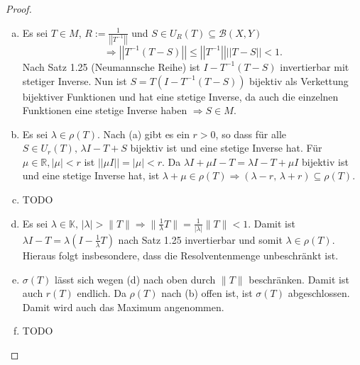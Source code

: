 \documentclass[ngerman]{article}
\theoremstyle{definition}%
\newcommand{\R}{\mathbb{R}}
\newcommand{\K}{\mathbb{K}}
\newcommand{\B}{\mathcal{B}} %
\newcommand{\abs}[1]{\left\lvert #1 \right\rvert }
\newcommand{\norm}[1]{\left\lvert \left\lvert #1 \right\rvert \right\rvert}
\newcommand{\df}{\Rightarrow} %
\renewcommand{\{ }{\left\lbrace}
\renewcommand{\}}{\right\rbrace}
\begin{document}
\begin{proof}
	\begin{enumerate}[(a)]
	\item Es sei $T \in M$, $R:= \frac{1}{\norm{T^{-1}}}$ und $ S\in U_R(T)\subseteq \B(X,Y)$ 
	$$\df \norm{ T^{-1} (T-S)} \leq \norm{T^{-1}} \norm{T-S} < 1.$$
	Nach Satz 1.25 (Neumannsche Reihe) ist $I-T^{-1}(T-S)$ invertierbar mit stetiger Inverse. Nun ist 
	$S = T(I-T^{-1}(T-S))$ bijektiv als Verkettung bijektiver Funktionen und hat eine stetige Inverse, da auch die einzelnen Funktionen eine stetige Inverse haben $\df S\in M$.
	
	\item Es sei $\lambda \in \rho(T)$. Nach (a) gibt es ein $r>0$, so dass für alle $S\in U_r(T),\,\lambda I -T+S$ bijektiv ist und eine stetige Inverse hat. Für $\mu \in \R,\abs{\mu} < r$ ist $\norm{\mu I} = \abs{\mu} < r$. Da $\lambda I + \mu I -T = \lambda I - T + \mu I$ bijektiv ist und eine stetige Inverse hat, ist $\lambda + \mu \in \rho(T) \df (\lambda - r,\, \lambda +r) \subseteq \rho(T)$. 
	
	\item TODO
	
	\item Es sei $\lambda \in \K,\, |\lambda| > \|T\| \df \|\frac{1}{\lambda} T \| = \frac{1}{|\lambda|} \| T \| < 1$. Damit ist $\lambda I - T = \lambda ( I - \frac{1}{\lambda}T)$ nach Satz 1.25 invertierbar und somit $\lambda \in \rho(T)$. Hieraus folgt insbesondere, dass die Resolventenmenge unbeschränkt ist.
	
	\item $\sigma(T)$ lässt sich wegen (d) nach oben durch $\|T\|$ beschränken. Damit ist auch $r(T)$ endlich. Da $\rho(T)$ nach (b) offen ist, ist $\sigma(T)$ abgeschlossen. Damit wird auch das Maximum angenommen.
	
	\item TODO
	\end{enumerate}
\end{proof}
\end{document}
